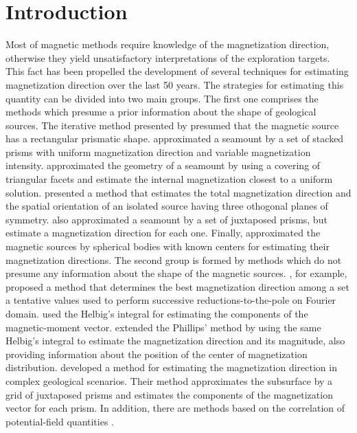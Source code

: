 \section{Introduction}

Most of  magnetic methods require knowledge of the magnetization direction, otherwise 
they yield unsatisfactory interpretations of the exploration targets. This fact has 
been propelled the development of several techniques for estimating magnetization 
direction over the last 50 years. The strategies for estimating this quantity can be 
divided into two main groups. The first one comprises the methods which presume a prior 
information about the shape of geological sources. The iterative method presented by 
\cite{bhattacharyya1966} presumed that the magnetic source has a rectangular prismatic shape. 
\cite{emilia_massey_1974} approximated a seamount by a set of stacked 
prisms with uniform magnetization direction and variable magnetization intensity. 
\cite{parker_etal_1987} approximated the geometry of a seamount by using a 
covering of triangular facets and estimate the internal magnetization closest to 
a uniform solution.
\cite{medeiros_silva_1995} presented a method that estimates the total magnetization 
direction and the spatial orientation of an isolated source having three othogonal planes of 
symmetry. 
\cite{kubota2005} also approximated a seamount by a set of juxtaposed prisms, but estimate a 
magnetization direction for each one. 
Finally, \cite{oliveirajr_etal_2015} approximated the magnetic sources by spherical bodies with 
known centers for estimating their magnetization directions. 
The second group is formed by methods which do not presume any information about the shape of the 
magnetic sources. \cite{fedi_etal_1994}, for example, proposed a method that determines the best 
magnetization direction among a set a tentative values used to perform 
successive reductions-to-the-pole on Fourier domain. 
\cite{phillips2005} used the Helbig's integral for estimating the components of the magnetic-moment vector. 
\cite{tontini_pedersen_2008} extended the Phillips' method by using the same Helbig's integral 
to estimate the magnetization direction and its magnitude, also providing information about the position 
of the center of magnetization distribution. \cite{lelievre_oldenburg_2009} developed a method for estimating 
the magnetization direction in complex geological scenarios. Their method approximates the subsurface 
by a grid of juxtaposed prisms and estimates the components of the magnetization vector for each prism.
In addition, there are methods based on the correlation of potential-field quantities \citep[e.g.,][]{dannemiller_li_2006,gerovska_etal_2009,liu_etal_2015,zhang_etal_2018}.

